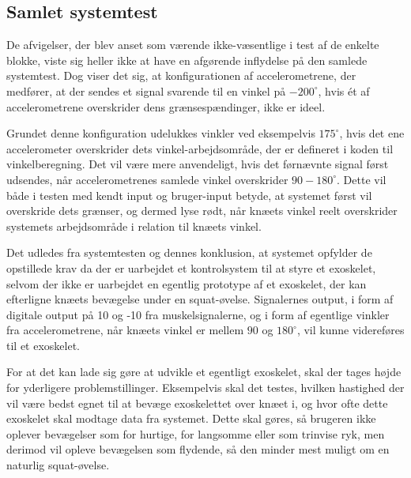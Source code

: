 
\subsection{Samlet systemtest}
De afvigelser, der blev anset som værende ikke-væsentlige i test af de enkelte blokke, viste sig heller ikke at have en afgørende inflydelse på den samlede systemtest. Dog viser det sig, at konfigurationen af accelerometrene, der medfører, at der sendes et signal svarende til en vinkel på $-200^{\circ}$, hvis ét af accelerometrene overskrider dens grænsespændinger, ikke er ideel.

Grundet denne konfiguration udelukkes vinkler ved eksempelvis $175^{\circ}$, hvis det ene accelerometer overskrider dets vinkel-arbejdsområde, der er defineret i koden til vinkelberegning.  Det vil være mere anvendeligt, hvis det førnævnte signal først udsendes, når accelerometrenes samlede vinkel overskrider $90-180^{\circ}$. Dette vil både i testen med kendt input og bruger-input betyde, at systemet først vil overskride dets grænser, og dermed lyse rødt, når knæets vinkel reelt overskrider systemets arbejdsområde i relation til knæets vinkel.

Det udledes fra systemtesten og dennes konklusion, at systemet opfylder de opstillede krav da der er uarbejdet et kontrolsystem til at styre et exoskelet, selvom der ikke er uarbejdet en egentlig prototype af et exoskelet, der kan efterligne knæets bevægelse under en squat-øvelse. Signalernes output, i form af digitale output på 10 og -10 fra muskelsignalerne, og i form af egentlige vinkler fra accelerometrene, når knæets vinkel er mellem $90$ og $180^{\circ}$, vil kunne videreføres til et exoskelet. 

For at det kan lade sig gøre at udvikle et egentligt exoskelet, skal der tages højde for yderligere problemstillinger. Eksempelvis skal det testes, hvilken hastighed der vil være bedst egnet til at bevæge exoskelettet over knæet i, og hvor ofte dette exoskelet skal modtage data fra systemet. Dette skal gøres, så brugeren ikke oplever bevægelser som for hurtige, for langsomme eller som trinvise ryk, men derimod vil opleve bevægelsen som flydende, så den minder mest muligt om en naturlig squat-øvelse.




